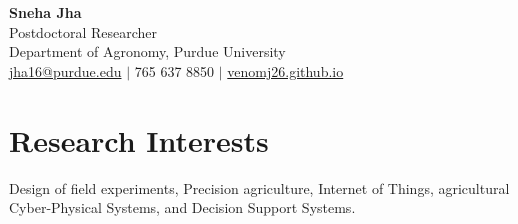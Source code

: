 \documentclass[10pt]{article}
\begin{document}
\begin{flushright}
    {\fontsize{12}{12}\bfseries Sneha Jha} \\[0.15em]

    {\fontsize{10}{10}\mdseries\selectfont Postdoctoral Researcher}\\
    {\fontsize{10}{10}\mdseries\selectfont Department of Agronomy, Purdue University}\\

    {\fontsize{10}{10}\mdseries\selectfont
    {\hypersetup{urlcolor=deepblue}
    {\color{deepblue}\faEnvelope[regular]} \href{mailto:jha16@purdue.edu}{jha16@purdue.edu}}
    $|$ 
    {\color{black}} 765 637 8850
    $|$
    {\hypersetup{urlcolor=deepblue}
    {\color{deepblue}} \href{https://venomj26.github.io/}{venomj26.github.io}}
    }
\end{flushright}

\section{ Research Interests}
\vspace{-1.25 em}
Design of field experiments, Precision agriculture, Internet of Things, agricultural Cyber-Physical Systems, and Decision Support Systems.
\vspace{-1 em}
\end{document}
